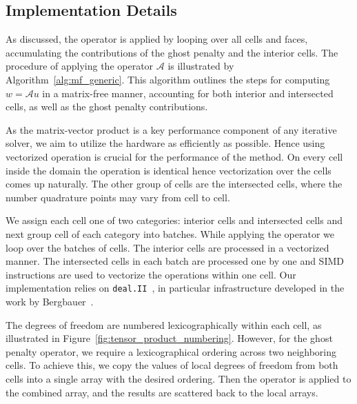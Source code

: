 \documentclass[11pt,a4paper]{article}
\begin{document}
\subsection{Implementation Details}

As discussed, the operator is applied by looping over all cells and faces, accumulating the contributions of the ghost
penalty and the interior cells. The procedure of applying the operator $\mathcal{A}$ is illustrated by
Algorithm~\ref{alg:mf_generic}. This algorithm outlines the steps for computing $w = \mathcal{A}u$ in a matrix-free
manner, accounting for both interior and intersected cells, as well as the ghost penalty contributions.

As the matrix-vector product is a key performance component of any iterative solver, we aim to utilize the hardware as
efficiently as possible. Hence using vectorized operation is crucial for the performance of the method. On every cell
inside the domain the operation is identical hence vectorization over the cells comes up naturally. The other group of
cells are the intersected cells, where the number quadrature points may vary from cell to cell.

We assign each cell one of two categories: interior cells and intersected cells and next group cell of each category
into batches. While applying the operator we loop over the batches of cells. The interior cells are processed in a
vectorized manner. The intersected cells in each batch are processed one by one and SIMD instructions are used to
vectorize the operations within one cell. Our implementation relies on \texttt{deal.II}~\cite{dealii2019design}, in
particular infrastructure developed in the work by Bergbauer~\cite{bergbauer2024high}.

The degrees of freedom are numbered lexicographically within each cell, as illustrated in
Figure~\ref{fig:tensor_product_numbering}. However, for the ghost penalty operator, we require a lexicographical
ordering across two neighboring cells. To achieve this, we copy the values of local degrees of freedom from both cells
into a single array with the desired ordering. Then the operator is applied to the combined array, and the results are
scattered back to the local arrays.

\end{document}
